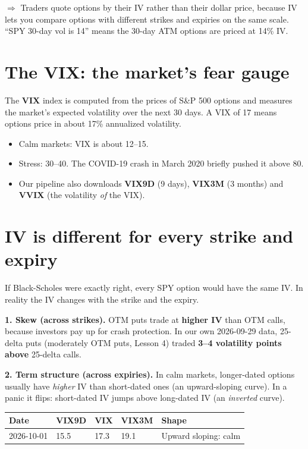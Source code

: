 \documentclass{article}
\begin{document}
\textbf{$\Rightarrow$} Traders quote options by their IV rather than their dollar price, because IV lets you compare options with different strikes and expiries on the same scale. ``SPY 30-day vol is 14'' means the 30-day ATM options are priced at 14\% IV.

\section{The VIX: the market's fear gauge}

The \textbf{VIX} index is computed from the prices of S\&P 500 options and measures the market's expected volatility over the next 30 days. A VIX of 17 means options price in about 17\% annualized volatility.

\begin{itemize}

\item Calm markets: VIX is about 12--15.

\item Stress: 30--40. The COVID-19 crash in March 2020 briefly pushed it above 80.

\item Our pipeline also downloads \textbf{VIX9D} (9 days), \textbf{VIX3M} (3 months) and \textbf{VVIX} (the volatility \emph{of} the VIX).

\end{itemize}

\section{IV is different for every strike and expiry}

If Black-Scholes were exactly right, every SPY option would have the same IV. In reality the IV changes with the strike and the expiry.

\textbf{1. Skew (across strikes).} OTM puts trade at \textbf{higher IV} than OTM calls, because investors pay up for crash protection. In our own 2026-09-29 data, 25-delta puts (moderately OTM puts, Lesson 4) traded \textbf{3--4 volatility points above} 25-delta calls.

\textbf{2. Term structure (across expiries).} In calm markets, longer-dated options usually have \emph{higher} IV than short-dated ones (an upward-sloping curve). In a panic it flips: short-dated IV jumps above long-dated IV (an \emph{inverted} curve).

\begin{center}\small
\begin{tabularx}{\linewidth}{l l l l >{\raggedright\arraybackslash}X}
\toprule
\textbf{Date} & \textbf{VIX9D} & \textbf{VIX} & \textbf{VIX3M} & \textbf{Shape} \\
\midrule
2026-10-01 & 15.5 & 17.3 & 19.1 & Upward sloping: calm \\
\bottomrule
\end{tabularx}
\end{center}
\end{document}
